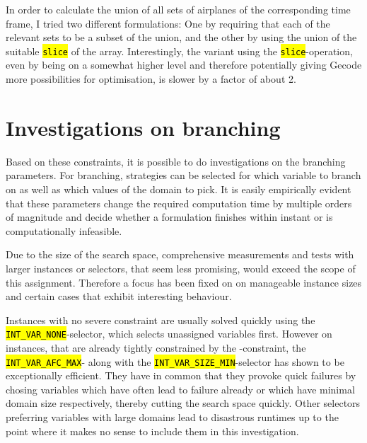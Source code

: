 \documentclass[,%
			paper=a4,%
			DIV11,
			liststotoc,
			bibtotoc,
			draft=false,%
			numbers=noendperiod
			]{scrartcl}
\newcommand{\ilc}[1]{\hl{\texttt{#1}}}
\newcommand{\mymarginnote}[1]{\marginnote{\footnotesize{#1}}}
\begin{document}
In order to calculate the union of all sets of airplanes of the corresponding time frame, I tried two different formulations: One by requiring that each of the relevant sets to be a subset of the union, and the other by using the union of the suitable \ilc{slice} of the array. Interestingly, the variant using the \ilc{slice}-operation, even by being on a somewhat higher level and therefore potentially giving Gecode more possibilities for optimisation, is slower by a factor of about 2.

\section{Investigations on branching}
Based on these constraints, it is possible to do investigations on the branching parameters. 
For branching, strategies can be selected for which variable to branch on as well as which values of the domain to pick.
It is easily empirically evident that these parameters change the required computation time by multiple orders of magnitude and decide whether a formulation finishes within instant or is computationally infeasible.

Due to the size of the search space, comprehensive measurements and tests with larger instances or selectors, that seem less promising, would exceed the scope of this assignment. Therefore a focus has been fixed on on manageable instance sizes and certain cases that exhibit interesting behaviour.

Instances with no severe constraint are usually solved quickly using the \ilc{INT\_VAR\_NONE}-selector, which selects unassigned variables first.
However on instances, that are already tightly constrained by the \Clandings-constraint, the \ilc{INT\_VAR\_AFC\_MAX}- along with the \ilc{INT\_VAR\_SIZE\_MIN}-selector has shown to be exceptionally efficient.
They have in common that they provoke quick failures by chosing variables which have often lead to failure already or which have minimal domain size respectively, thereby cutting the search space quickly.
Other selectors preferring variables with large domains lead to disastrous runtimes up to the point where it makes no sense to include them in this investigation.
\end{document}
